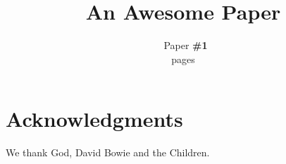 \documentclass[letterpaper,twocolumn,10pt]{article}
\date{}
\author{\
{\rm Paper \textbf{\#1}}\\
\pageref{LastPage} pages
}
\begin{document}
\title{\Large \textbf{An Awesome Paper}}
\maketitle










\section*{Acknowledgments}

We thank God, David Bowie and the Children.

{%
  \frenchspacing
  
  
}
\end{document}
